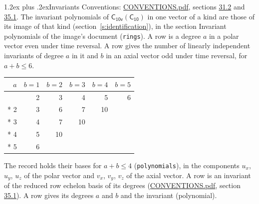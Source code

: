 \documentclass[10pt,a4paper]{article}
\makeatletter
\renewcommand\section{\@startsection{section}{1}{\z@}{-3ex plus -1ex minus -.2ex}%
  {1.2ex plus .2ex}{\normalfont\large\sffamily\bfseries\color{parttitle}}}
\numberwithin{equation}{section}
\newcommand{\grp}[1]{\mathsf{#1}}
\makeatother
\begin{document}
\section{Invariants}\label{s:invariants}
Conventions: \href{../../CONVENTIONS.pdf}{CONVENTIONS.pdf}, sections \href{../../CONVENTIONS.pdf\#conv.31.2}{31.2} and \href{../../CONVENTIONS.pdf\#conv.35.1}{35.1}.
The invariant polynomials of $\grp{C_{10v}}(\grp{C_{10}})$ in one vector of a kind are those of its image of that kind (section~\ref{s:identification}), in the section Invariant polynomials of the image's document (\texttt{rings}).
\leavevmode\label{n:index.degree.polar}\label{n:index.degree.axial}A row is a degree $a$ in a polar vector even under time reversal. A row gives the number of linearly independent invariants of degree $a$ in it and $b$ in an axial vector odd under time reversal, for $a + b \le 6$.
{\small\begin{longtable}{@{}rrrrrr@{}}\toprule
$a$ & $b = 1$ & $b = 2$ & $b = 3$ & $b = 4$ & $b = 5$\\\midrule\endhead
\bottomrule\endfoot\endlastfoot
1 & 2 & 3 & 4 & 5 & 6\\*
2 & 3 & 6 & 7 & 10 & \\*
3 & 4 & 7 & 10 &  & \\*
4 & 5 & 10 &  &  & \\*
5 & 6 &  &  &  & \\
\bottomrule\end{longtable}}
\leavevmode\label{n:local.component.polar}\label{n:local.component.axial}The record holds their bases for $a + b \le 4$ (\texttt{polynomials}), in the components $u_{x}$, $u_{y}$, $u_{z}$ of the polar vector and $v_{x}$, $v_{y}$, $v_{z}$ of the axial vector. \label{n:head.polynomial}A row is an invariant of the reduced row echelon basis of its degrees (\href{../../CONVENTIONS.pdf}{CONVENTIONS.pdf}, section \href{../../CONVENTIONS.pdf\#conv.35.1}{35.1}). A row gives its degrees $a$ and $b$ and the invariant (polynomial).
\end{document}
